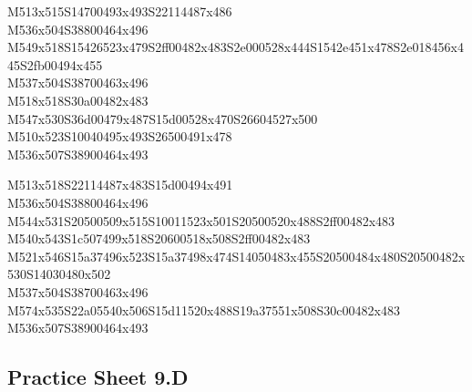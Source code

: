 \documentclass{article}
\begin{document}
\begin{multicols}{5}
\begin{center}
M513x515S14700493x493S22114487x486 %
\\M536x504S38800464x496 %
\\M549x518S15426523x479S2ff00482x483S2e000528x444S1542e451x478S2e018456x445S2fb00494x455 %
\\M537x504S38700463x496 %
\\M518x518S30a00482x483 %
\\M547x530S36d00479x487S15d00528x470S26604527x500 %
\\M510x523S10040495x493S26500491x478 %
\\M536x507S38900464x493 %
\vfil
\columnbreak

M513x518S22114487x483S15d00494x491 %
\\M536x504S38800464x496 %
\\M544x531S20500509x515S10011523x501S20500520x488S2ff00482x483 %
\\M540x543S1c507499x518S20600518x508S2ff00482x483 %
\\M521x546S15a37496x523S15a37498x474S14050483x455S20500484x480S20500482x530S14030480x502 %
\\M537x504S38700463x496 %
\\M574x535S22a05540x506S15d11520x488S19a37551x508S30c00482x483 %
\\M536x507S38900464x493 %
\vfil

\end{center}
\end{multicols}

\subsection{Practice Sheet 9.D}
\end{document}
